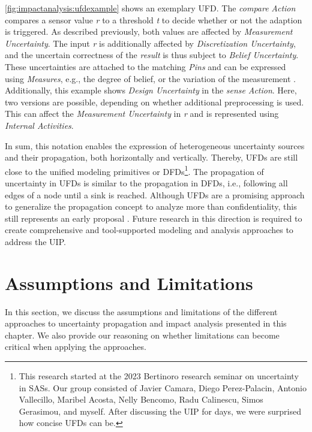 \autoref{fig:impactanalysis:ufdexample} shows an exemplary \ac{UFD}.
The \emph{compare} \emph{Action} compares a sensor value \emph{r} to a threshold \emph{t} to decide whether or not the adaption is triggered.
As described previously, both values are affected by \emph{Measurement Uncertainty}.
The input \emph{r} is additionally affected by \emph{Discretization Uncertainty}, and the uncertain correctness of the \emph{result} is thus subject to \emph{Belief Uncertainty}.
These uncertainties are attached to the matching \emph{Pins} and can be expressed using \emph{Measures}, e.g., the degree of belief, or the variation of the measurement \cite{PSUM}.
Additionally, this example shows \emph{Design Uncertainty} in the \emph{sense} \emph{Action}.
Here, two versions are possible, depending on whether additional preprocessing is used.
This can affect the \emph{Measurement Uncertainty} in \emph{r} and is represented using \emph{Internal Activities}.

In sum, this notation enables the expression of heterogeneous uncertainty sources and their propagation, both horizontally and vertically.
Thereby, \acp{UFD} are still close to the unified modeling primitives \cite{seifermann_unified_2021} or \acp{DFD}\footnote{This research started at the 2023 Bertinoro research seminar on uncertainty in \acp{SAS}. Our group consisted of Javier Camara, Diego Perez-Palacin, Antonio Vallecillo, Maribel Acosta, Nelly Bencomo, Radu Calinescu, Simos Gerasimou, and myself. After discussing the \acf{UIP} for days, we were surprised how concise \acfp{UFD} can be.}.
The propagation of uncertainty in \acp{UFD} is similar to the propagation in \acp{DFD}, i.e., following all edges of a node until a sink is reached.
Although \acp{UFD} are a promising approach to generalize the propagation concept to analyze more than confidentiality, this still represents an early proposal \cite{weyns_towards_2023}.
Future research in this direction is required to create comprehensive and tool-supported modeling and analysis approaches to address the \ac{UIP}.





\section{Assumptions and Limitations}%
\label{sec:impactanalysis:limitations}

In this section, we discuss the assumptions and limitations of the different approaches to uncertainty propagation and impact analysis presented in this chapter.
We also provide our reasoning on whether limitations can become critical when applying the approaches.

